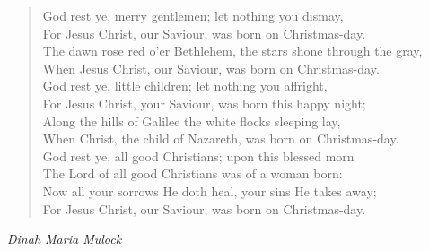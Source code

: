 
\begin{verse}
God rest ye, merry gentlemen; let nothing you dismay,\\
For Jesus Christ, our Saviour, was born on Christmas-day.\\
The dawn rose red o'er Bethlehem, the stars shone through the gray,\\
When Jesus Christ, our Saviour, was born on Christmas-day.\\[0.7em]

God rest ye, little children; let nothing you affright,\\
For Jesus Christ, your Saviour, was born this happy night;\\
Along the hills of Galilee the white flocks sleeping lay,\\
When Christ, the child of Nazareth, was born on Christmas-day.\\[0.7em]

God rest ye, all good Christians; upon this blessed morn\\
The Lord of all good Christians was of a woman born:\\
Now all your sorrows He doth heal, your sins He takes away;\\
For Jesus Christ, our Saviour, was born on Christmas-day.%
\end{verse}

\vspace{0.5\baselineskip}
\noindent\textit{Dinah Maria Mulock}

\newpage
